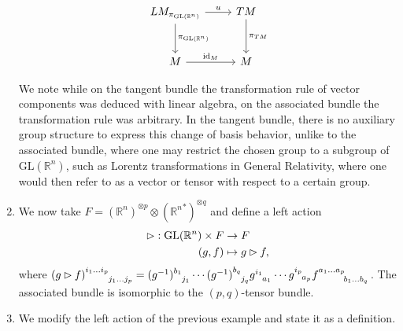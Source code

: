 \begin{example}
\begin{enumerate}[label=(\alph*)]
            \begin{equation*}
                \begin{tikzcd}[column sep = normal, row sep = large]
                    LM_{\pi_{\mathrm{GL}(\mathbb{R}^n)}} \arrow{r}{u} \arrow{d}{\pi_{\mathrm{GL}(\mathbb{R}^n)}} & TM \arrow{d}{\pi_{TM}}\\
                    M \arrow{r}{\id{M}} & M
                \end{tikzcd}
            \end{equation*}

            We note while on the tangent bundle the transformation rule of vector components was deduced with linear algebra, on the associated bundle the transformation rule was arbitrary. In the tangent bundle, there is no auxiliary group structure to express this change of basis behavior, unlike to the associated bundle, where one may restrict the chosen group to a subgroup of \(\mathrm{GL}(\mathbb{R}^n)\), such as Lorentz transformations in General Relativity, where one would then refer to as a vector or tensor with respect to a certain group.
        \item We now take \(F = \left(\mathbb{R}^n\right)^{\otimes p} \otimes \left({\mathbb{R}^n}^{\ast}\right)^{\otimes q}\) and define a left action
            \begin{align*}
                \mathbin{\vartriangleright} : \mathrm{GL}(\mathbb{R}^n) \times F &\to F\\
                                                     (g,f) &\mapsto g \mathbin{\vartriangleright} f,
            \end{align*}
            where \((g \lact f)\indices{^{i_1\dots i_p}_{j_1\dots j_p}} = (g^{-1})\indices{^{b_1}_{j_1}}\dotsm (g^{-1})\indices{^{b_q}_{j_q}} g\indices{^{i_1}_{a_1}} \dotsm g\indices{^{i_p}_{a_p}}f\indices{^{a_1\dots a_p}_{b_1\dots b_q}}\). The associated bundle  is isomorphic to the \((p,q)\)-tensor bundle.
        \item We modify the left action of the previous example and state it as a definition.
    \end{enumerate}
\end{example}

